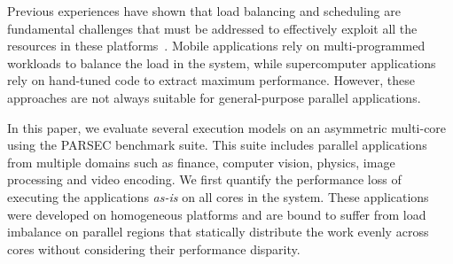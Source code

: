 Previous experiences have shown that load balancing and scheduling are fundamental challenges that 
must be addressed to effectively exploit all the resources in these 
platforms~\cite{Suleman:APLOS2009,Fedorova2009,Greenhalgh2011,Joao:ASPLOS2012,Joao:ISCA2013,
ARM4HPC_SC13}. 
Mobile applications rely on multi-programmed workloads to balance the load in the 
system, while supercomputer applications rely on hand-tuned code to extract maximum 
performance. However, these approaches are not always suitable for general-purpose parallel 
applications.



In this paper, we evaluate several execution models on an asymmetric multi-core
using the PARSEC benchmark suite. This suite includes parallel applications from multiple domains 
such as finance, computer vision, physics, image processing and video encoding. We first quantify 
the performance loss of executing the applications \textit{as-is} on all cores 
in the system. These applications were developed on homogeneous platforms and are bound to suffer from
load imbalance on parallel regions that statically distribute the work
evenly across cores without considering their performance disparity.


